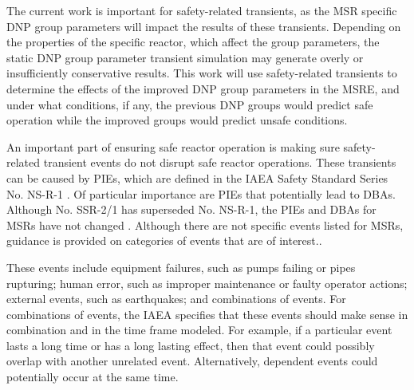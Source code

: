 The current work is important for safety-related transients, as the \gls{MSR} specific \gls{DNP} group parameters will impact the results of these transients.
Depending on the properties of the specific reactor, which affect the group parameters, the static \gls{DNP} group parameter transient simulation may generate overly or insufficiently conservative results.
This work will use safety-related transients to determine the effects of the improved \gls{DNP} group parameters in the \gls{MSRE}, and under what conditions, if any, the previous \gls{DNP} groups would predict safe operation while the improved groups would predict unsafe conditions.

An important part of ensuring safe reactor operation is making sure safety-related transient events do not disrupt safe reactor operations.
These transients can be caused by \glspl{PIE}, which are defined in the \gls{IAEA} Safety Standard Series No. NS-R-1 \cite{international2000iaea}.
Of particular importance are \glspl{PIE} that potentially lead to \glspl{DBA}.
Although No. SSR-2/1 has superseded No. NS-R-1, the \glspl{PIE} and \glspl{DBA} for \glspl{MSR} have not changed \cite{international2016iaea}.
Although there are not specific events listed for \glspl{MSR}, guidance is provided on categories of events that are of interest..

These events include equipment failures, such as pumps failing or pipes rupturing; human error, such as improper maintenance or faulty operator actions; external events, such as earthquakes; and combinations of events.
For combinations of events, the \gls{IAEA} specifies that these events should make sense in combination and in the time frame modeled.
For example, if a particular event lasts a long time or has a long lasting effect, then that event could possibly overlap with another unrelated event.
Alternatively, dependent events could potentially occur at the same time.


